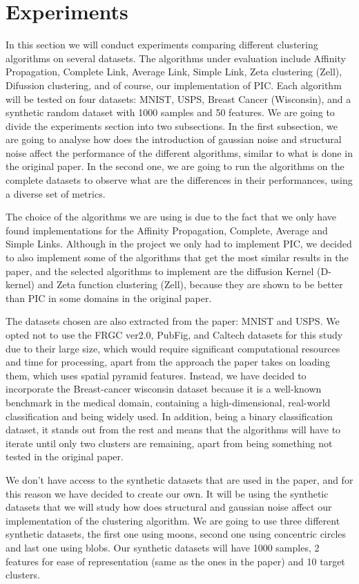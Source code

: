 \documentclass[
	10pt,
	parskip=half-,	
	paper=a4,
	english
	]{scrartcl}
\begin{document}
\section {Experiments}

In this section we will conduct experiments comparing different clustering algorithms on several datasets. The algorithms under evaluation include Affinity Propagation, Complete Link, Average Link, Simple Link, Zeta clustering (Zell), Difussion clustering, and of course, our implementation of PIC. Each algorithm will be tested on four datasets: MNIST, USPS, Breast Cancer (Wisconsin), and a synthetic random dataset with 1000 samples and 50 features. We are going to divide the experiments section into two subsections. In the first subsection, we are going to analyse how does the introduction of gaussian noise and structural noise affect the performance of the different algorithms, similar to what is done in the original paper. In the second one, we are going to run the algorithms on the complete datasets to observe what are the differences in their performances, using a diverse set of metrics.

The choice of the algorithms we are using is due to the fact that we only have found implementations for the Affinity Propagation, Complete, Average and Simple Links. Although in the project we only had to implement PIC, we decided to also implement some of the algorithms that get the most similar results in the paper, and the selected algorithms to implement are the diffusion Kernel (D-kernel) and Zeta function clustering (Zell), because they are shown to be better than PIC in some domains in the original paper.

The datasets chosen are also extracted from the paper: MNIST and USPS. We opted not to use the FRGC ver2.0, PubFig, and Caltech datasets for this study due to their large size, which would require significant computational resources and time for processing, apart from the approach the paper takes on loading them, which uses spatial pyramid features. Instead, we have decided to incorporate the Breast-cancer wisconsin dataset because it is a well-known benchmark in the medical domain, containing a high-dimensional, real-world classification and being widely used. In addition, being a binary classification dataset, it stands out from the rest and means that the algorithms will have to iterate until only two clusters are remaining, apart from being something not tested in the original paper.

We don't have access to the synthetic datasets that are used in the paper, and for this reason we have decided to create our own. It will be using the synthetic datasets that we will study how does structural and gaussian noise affect our implementation of the clustering algorithm. We are going to use three different synthetic datasets, the first one using moons, second one using concentric circles and last one using blobs. Our synthetic datasets will have 1000 samples, 2 features for ease of representation (same as the ones in the paper) and 10 target clusters.
\end{document}
